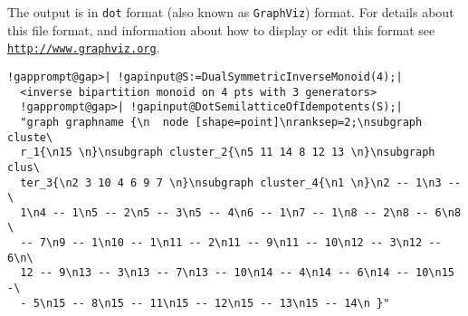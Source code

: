 \documentclass[a4paper,11pt]{report}
\begin{document}
{{{ The output is in \texttt{dot} format (also known as \texttt{GraphViz}) format. For details about this file format, and information about how to
display or edit this format see \href{http://www.graphviz.org} {\texttt{http://www.graphviz.org}}. 

 
\begin{Verbatim}[commandchars=!@|,fontsize=\small,frame=single,label=Example]
  !gapprompt@gap>| !gapinput@S:=DualSymmetricInverseMonoid(4);|
  <inverse bipartition monoid on 4 pts with 3 generators>
  !gapprompt@gap>| !gapinput@DotSemilatticeOfIdempotents(S);|
  "graph graphname {\n  node [shape=point]\nranksep=2;\nsubgraph cluste\
  r_1{\n15 \n}\nsubgraph cluster_2{\n5 11 14 8 12 13 \n}\nsubgraph clus\
  ter_3{\n2 3 10 4 6 9 7 \n}\nsubgraph cluster_4{\n1 \n}\n2 -- 1\n3 -- \
  1\n4 -- 1\n5 -- 2\n5 -- 3\n5 -- 4\n6 -- 1\n7 -- 1\n8 -- 2\n8 -- 6\n8 \
  -- 7\n9 -- 1\n10 -- 1\n11 -- 2\n11 -- 9\n11 -- 10\n12 -- 3\n12 -- 6\n\
  12 -- 9\n13 -- 3\n13 -- 7\n13 -- 10\n14 -- 4\n14 -- 6\n14 -- 10\n15 -\
  - 5\n15 -- 8\n15 -- 11\n15 -- 12\n15 -- 13\n15 -- 14\n }"
\end{Verbatim}
 }

 }

 }

  
\end{document}
